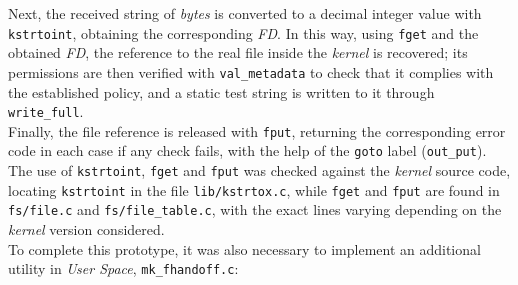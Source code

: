 Next, the received string of \textit{bytes} is converted to a decimal integer value with \verb|kstrtoint|, obtaining the corresponding \textit{FD}.
In this way, using \verb|fget| and the obtained \textit{FD}, the reference to the real file inside the \textit{kernel} is recovered; its permissions are then verified with \verb|val_metadata| to check that it complies with the established policy, and a static test string is written to it through \verb|write_full|.\\

Finally, the file reference is released with \verb|fput|, returning the corresponding error code in each case if any check fails, with the help of the \verb|goto| label (\verb|out_put|).\\

The use of \verb|kstrtoint|, \verb|fget| and \verb|fput| was checked against the \textit{kernel} source code, locating \verb|kstrtoint| in the file \texttt{lib/kstrtox.c}, while \verb|fget| and \verb|fput| are found in \texttt{fs/file.c} and \texttt{fs/file\_table.c}, with the exact lines varying depending on the \textit{kernel} version considered.\\

To complete this prototype, it was also necessary to implement an additional utility in \textit{User Space}, \texttt{mk\_fhandoff.c}:

